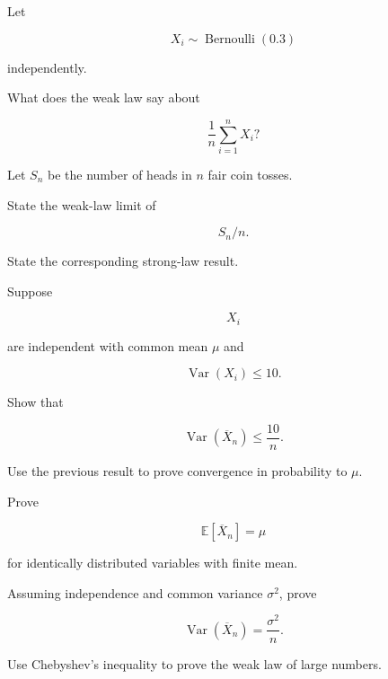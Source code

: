 \begin{exercise}[2]
Let

\[
X_i\sim\operatorname{Bernoulli}(0.3)
\]

independently.

What does the weak law say about

\[
\frac1n
\sum_{i=1}^{n}X_i?
\]
\end{exercise}

\begin{exercise}[2]
Let \(S_n\) be the number of heads in \(n\) fair coin tosses.

State the weak-law limit of

\[
S_n/n.
\]
\end{exercise}

\begin{exercise}[2]
State the corresponding strong-law result.
\end{exercise}

\begin{exercise}[2]
Suppose

\[
X_i
\]

are independent with common mean \(\mu\) and

\[
\operatorname{Var}(X_i)\leq10.
\]

Show that

\[
\operatorname{Var}(\overline{X}_n)
\leq
\frac{10}{n}.
\]
\end{exercise}

\begin{exercise}[2]
Use the previous result to prove convergence in probability to \(\mu\).
\end{exercise}

\begin{exercise}[3]
Prove

\[
\mathbb{E}[\overline{X}_n]
=
\mu
\]

for identically distributed variables with finite mean.
\end{exercise}

\begin{exercise}[3]
Assuming independence and common variance \(\sigma^2\), prove

\[
\operatorname{Var}(\overline{X}_n)
=
\frac{\sigma^2}{n}.
\]
\end{exercise}

\begin{exercise}[3]
Use Chebyshev's inequality to prove the weak law of large numbers.
\end{exercise}

